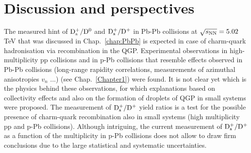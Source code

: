 \section{Discussion and perspectives}
\label{sec:discussionpPb}
The measured hint of ${\rm D_s^+}/{\rm D^0}$ and ${\rm D_s^+}/{\rm D^+}$ in Pb-Pb collisions at $\sqrt{s_{\rm NN}}=5.02$ TeV
that was discussed in Chap.~\ref{chap:PbPb} is expected in case of charm-quark hadronisation
via recombination in the QGP. Experimental observations in high-multiplicity pp collisions and in p-Pb collisions that resemble
effects observed in Pb-Pb collisions (long-range rapidity correlations, measurements of azimuthal anisotropies $v_n$ ...) (see Chap.~\ref{Chapter1}) 
were found.
It is not clear yet which is the physics behind these observations, for which 
explanations based on collectivity effects and also on the formation of droplets of QGP in small systems were proposed.
The measurement of ${\rm D_s^+}/{\rm D^+}$ yield ratios is a test for the possible presence of charm-quark recombination
also in small systems (high multiplicity pp and p-Pb collisions). Although intriguing, 
the current measurement of ${\rm D_s^+}/{\rm D^+}$ as a function of the multiplicity in p-Pb collisions does
not allow to draw firm conclusions due to the large statistical and systematic uncertainties.\\




